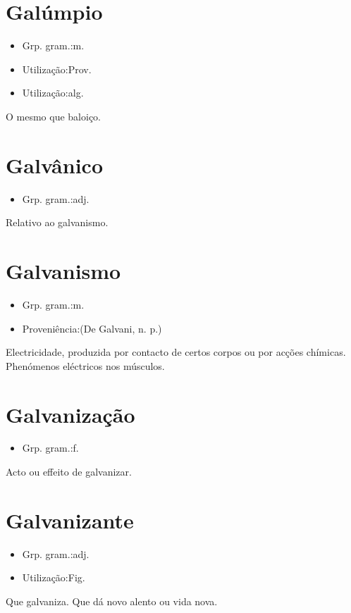 \section{Galúmpio}
\begin{itemize}
\item {Grp. gram.:m.}
\end{itemize}
\begin{itemize}
\item {Utilização:Prov.}
\end{itemize}
\begin{itemize}
\item {Utilização:alg.}
\end{itemize}
O mesmo que \textunderscore baloiço\textunderscore .
\section{Galvânico}
\begin{itemize}
\item {Grp. gram.:adj.}
\end{itemize}
Relativo ao galvanismo.
\section{Galvanismo}
\begin{itemize}
\item {Grp. gram.:m.}
\end{itemize}
\begin{itemize}
\item {Proveniência:(De \textunderscore Galvani\textunderscore , n. p.)}
\end{itemize}
Electricidade, produzida por contacto de certos corpos ou por acções chímicas.
Phenómenos eléctricos nos músculos.
\section{Galvanização}
\begin{itemize}
\item {Grp. gram.:f.}
\end{itemize}
Acto ou effeito de galvanizar.
\section{Galvanizante}
\begin{itemize}
\item {Grp. gram.:adj.}
\end{itemize}
\begin{itemize}
\item {Utilização:Fig.}
\end{itemize}
Que galvaniza.
Que dá novo alento ou vida nova.
